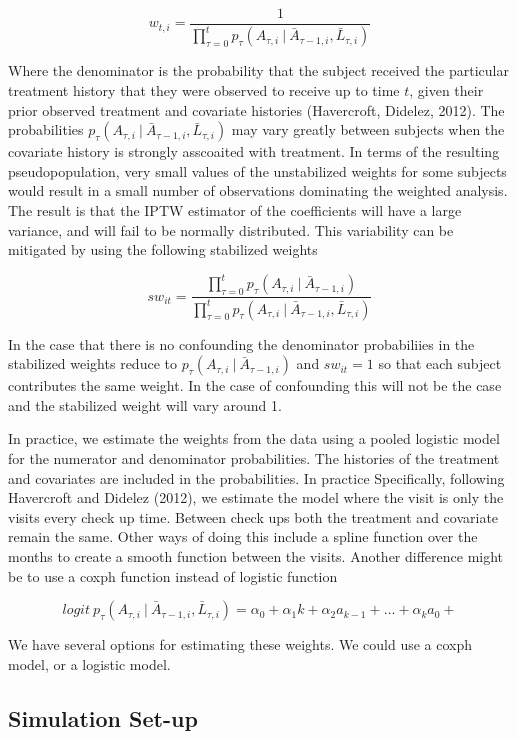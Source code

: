 \documentclass[11pt]{article}
\begin{document}
\[w_{t,i} = \frac{1}{\prod_{\tau=0} ^ t p_{\tau} (A_{\tau, i}\ |\ \bar A_{\tau-1, i}, \bar L_{\tau, i})}\]

Where the denominator is the probability that the subject received the
particular treatment history that they were observed to receive up to
time \(t\), given their prior observed treatment and covariate histories
(Havercroft, Didelez, 2012). The probabilities
\(p_{\tau} (A_{\tau, i}\ |\ \bar A_{\tau-1, i}, \bar L_{\tau, i})\) may
vary greatly between subjects when the covariate history is strongly
asscoaited with treatment. In terms of the resulting pseudopopulation,
very small values of the unstabilized weights for some subjects would
result in a small number of observations dominating the weighted
analysis. The result is that the IPTW estimator of the coefficients will
have a large variance, and will fail to be normally distributed. This
variability can be mitigated by using the following stabilized weights

\[sw_{it} = \frac{\prod_{\tau=0} ^ t p_{\tau} (A_{\tau, i}\ |\ \bar A_{\tau-1, i})} {\prod_{\tau=0} ^ t p_{\tau} (A_{\tau, i}\ |\ \bar A_{\tau-1, i}, \bar L_{\tau, i})}\]

In the case that there is no confounding the denominator probabiliies in
the stabilized weights reduce to
\(p_{\tau} (A_{\tau, i}\ |\ \bar A_{\tau-1, i})\) and \(sw_{it}=1\) so
that each subject contributes the same weight. In the case of
confounding this will not be the case and the stabilized weight will
vary around 1.

In practice, we estimate the weights from the data using a pooled
logistic model for the numerator and denominator probabilities. The
histories of the treatment and covariates are included in the
probabilities. In practice Specifically, following Havercroft and
Didelez (2012), we estimate the model where the visit is only the visits
every check up time. Between check ups both the treatment and covariate
remain the same. Other ways of doing this include a spline function over
the months to create a smooth function between the visits. Another
difference might be to use a coxph function instead of logistic function

\[logit\ p_{\tau} (A_{\tau, i}\ |\ \bar A_{\tau-1, i}, \bar L_{\tau, i}) = \alpha_0 + \alpha_1 k + \alpha_2 a_{k-1} + \dots + \alpha_k a_0 + \]

We have several options for estimating these weights. We could use a
coxph model, or a logistic model.

\subsection{Simulation Set-up}\label{simulation-set-up}
\end{document}
